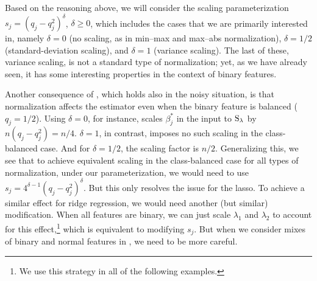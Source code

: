 Based on the reasoning above, we will consider the scaling parameterization \(s_j =
(q_j-q_j^2)^\delta\), \(\delta \geq 0\), which includes the cases that we are primarily
interested in, namely \(\delta = 0\) (no scaling, as in min--max and max--abs
normalization), \(\delta = 1/2\) (standard-deviation scaling), and \(\delta = 1\) (variance
scaling). The last of these, variance scaling, is not a standard type of normalization;
yet, as we have already seen, it has some interesting properties in the context of binary
features.

Another consequence of , which holds also in the noisy
situation, is that normalization affects the estimator even when the binary feature is
balanced (\(q_j = 1/2\)). Using \(\delta = 0\), for instance, scales \(\beta_j^*\) in the
input to \(\operatorname{S}_\lambda\) by \(n (q_j - q_j^2) = n/4\). \(\delta = 1\), in contrast, imposes
no such scaling in the class-balanced case. And for \(\delta = 1/2\), the scaling factor is
\(n/2\). Generalizing this, we see that to achieve equivalent scaling in the class-balanced
case for all types of normalization, under our parameterization, we would need to use \(s_j
= 4^{\delta - 1} (q_j - q_j^2)^\delta\). But this only resolves the issue for the lasso. To
achieve a similar effect for ridge regression, we would need another (but similar)
modification. When all features are binary, we can just scale \(\lambda_1\) and
\(\lambda_2\) to account for this effect,\footnote{We use this strategy in all of the
  following examples.} which is equivalent to modifying \(s_j\). But when we consider mixes
of binary and normal features in , we need to be more careful.

